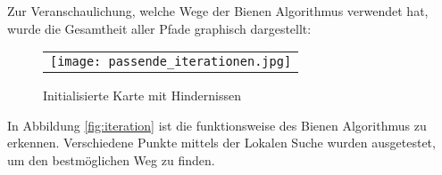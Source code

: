 Zur Veranschaulichung, welche Wege der Bienen Algorithmus verwendet hat, wurde die Gesamtheit aller Pfade graphisch dargestellt:
\begin{figure}[H]
    \begin{tabular}{@{}r@{}} 
        \texttt{[image: passende\_iterationen.jpg]}
    \end{tabular}
    \caption{Initialisierte Karte mit Hindernissen\\}   
    \label{fig:iterationen}
\end{figure}

In Abbildung \ref{fig:iteration} ist die funktionsweise des Bienen Algorithmus zu erkennen. Verschiedene Punkte mittels der Lokalen Suche wurden ausgetestet, um den bestmöglichen Weg zu finden.